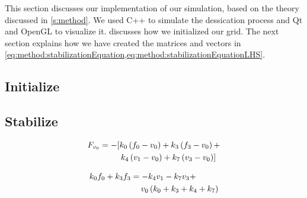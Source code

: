 This section discusses our implementation of our simulation, based on the theory discussed in \cref{s:method}. We used C++ to simulate the dessication process and  Qt\cite{qt} and OpenGL\cite{openGL} to visualize it.  discusses how we initialized our grid. The next section explains how we have created the matrices and vectors in \cref{eq:method:stabilizationEquation,eq:method:stabilizationEquationLHS}.

\subsection{Initialize}
\label{s:implementation:init}







\subsection{Stabilize}
\label{s:implementation:stabilize}



\begin{equation}\label{eq:implementation:forceOnVo}
	\begin{split}
	F_{v_{0}} 	& = - [				k_{0} \left(f_{0} - v_{0}\right) +
												k_{3} \left(f_{3} - v_{0}\right) + \\
							& \quad\quad\;\;	k_{4} \left(v_{1} - v_{0}\right)  +
												k_{7} \left(v_{3} - v_{0}\right) ]
	\end{split}
\end{equation}


\begin{equation}\label{eq:implementation:forceOnVoVersimpled}
	\begin{split}
	k_{0}f_{0} + k_{3}f_{3} 
		&= - k_{4}v_{1} - k_{7}v_{3} + \\
		& \quad\: v_{0} \left( k_{0} + k_{3} + k_{4} + k_{7} \right)
	\end{split}
\end{equation}

